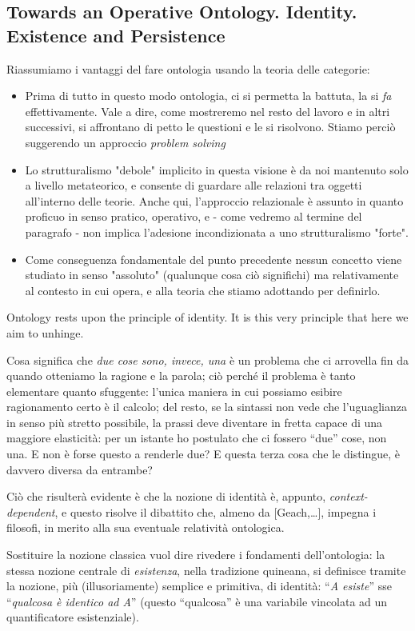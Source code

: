 \documentclass[a4paper, 11pt]{article}
\begin{document}
	
	\subsection{Towards an Operative Ontology. Identity. Existence and Persistence}
	
	Riassumiamo i vantaggi del fare ontologia usando la teoria delle categorie:
	\begin{itemize}
		\item Prima di tutto in questo modo ontologia, ci si permetta la battuta, la si \emph{fa} effettivamente. Vale a dire, come mostreremo nel resto del lavoro e in altri successivi, si affrontano di petto le questioni e le si risolvono. Stiamo perciò suggerendo un approccio \emph{problem solving}
		\item Lo strutturalismo "debole" implicito in questa visione è da noi mantenuto solo a livello metateorico, e consente di guardare alle relazioni tra oggetti all'interno delle teorie. Anche qui, l'approccio relazionale è assunto in quanto proficuo in senso pratico, operativo, e - come vedremo al termine del paragrafo - non implica l'adesione incondizionata a uno strutturalismo "forte".
		\item Come conseguenza fondamentale del punto precedente nessun concetto viene studiato in senso "assoluto" (qualunque cosa ciò significhi) ma relativamente al contesto in cui opera, e alla teoria che stiamo adottando per definirlo.  
	\end{itemize}
	Ontology rests upon the principle of identity. It is this very principle that here we aim to unhinge.
	
	Cosa significa che \emph{due cose sono, invece, una} è un problema che ci arrovella fin da quando otteniamo la ragione e la parola; ciò perché il problema è tanto elementare quanto sfuggente: l'unica maniera in cui possiamo esibire ragionamento certo è il calcolo; del resto, se la sintassi non vede che l'uguaglianza in senso più stretto possibile, la prassi deve diventare in fretta capace di una maggiore elasticità: per un istante ho postulato che ci fossero ``due'' cose, non una. E non è forse questo a renderle due? E questa terza cosa che le distingue, è davvero diversa da entrambe?
	
	Ciò che risulterà evidente è che la nozione di identità è, appunto, \emph{context-dependent}, e questo risolve il dibattito che, almeno da [Geach,\dots], impegna i filosofi, in merito alla sua eventuale relatività ontologica. 
	
	Sostituire la nozione classica vuol dire rivedere i fondamenti dell'ontologia: la stessa nozione centrale di \emph{esistenza}, nella tradizione quineana, si definisce tramite la nozione, più (illusoriamente) semplice e primitiva, di identità: ``\textit{A esiste}'' sse ``\textit{qualcosa è identico ad A}'' (questo ``qualcosa'' è una variabile vincolata ad un quantificatore esistenziale).
	
\end{document}
